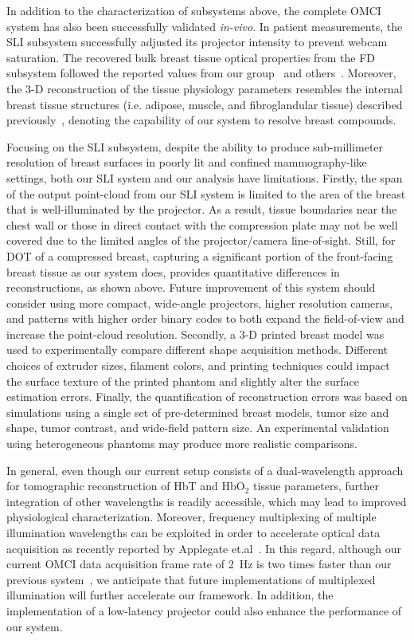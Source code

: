 In addition to the characterization of subsystems above, the complete OMCI system has also been successfully validated \textit{in-vivo}. In patient measurements, the SLI subsystem successfully adjusted its projector intensity to prevent webcam saturation. The recovered bulk breast tissue optical properties from the FD subsystem followed the reported values from our group~\cite{Fang2009} and others~\cite{Durduran2002}. Moreover, the 3-D reconstruction of the tissue physiology parameters resembles the internal breast tissue structures (i.e. adipose, muscle, and fibroglandular tissue) described previously~\cite{Fang2009}, denoting the capability of our system to resolve breast compounds.

Focusing on the SLI subsystem, despite the ability to produce sub-millimeter resolution of breast surfaces in poorly lit and confined mammography-like settings, both our SLI system and our analysis have limitations. Firstly, the span of the output point-cloud from our SLI system is limited to the area of the breast that is well-illuminated by the projector. As a result, tissue boundaries near the chest wall or those in direct contact with the compression plate may not be well covered due to the limited angles of the projector/camera line-of-sight. Still, for DOT of a compressed breast, capturing a significant portion of the front-facing breast tissue as our system does, provides quantitative differences in reconstructions, as shown above. Future improvement of this system should consider using more compact, wide-angle projectors, higher resolution cameras, and patterns with higher order binary codes to both expand the field-of-view and increase the point-cloud resolution. Secondly, a 3-D printed breast model was used to experimentally compare different shape acquisition methods. Different choices of extruder sizes, filament colors, and printing techniques could impact the surface texture of the printed phantom and slightly alter the surface estimation errors. Finally, the quantification of reconstruction errors was based on simulations using a single set of pre-determined breast models, tumor size and shape, tumor contrast, and wide-field pattern size. An experimental validation using heterogeneous phantoms may produce more realistic comparisons.

In general, even though our current setup consists of a dual-wavelength approach for tomographic reconstruction of HbT and HbO$_2$ tissue parameters, further integration of other wavelengths is readily accessible, which may lead to improved physiological characterization. Moreover, frequency multiplexing of multiple illumination wavelengths can be exploited in order to accelerate optical data acquisition as recently reported by Applegate et.al~\cite{Applegate2017}. In this regard, although our current OMCI data acquisition frame rate of 2~Hz is two times faster than our previous system~\cite{Zimmermann2017}, we anticipate that future implementations of multiplexed illumination will further accelerate our framework. In addition, the implementation of a low-latency projector could also enhance the performance of our system. 

